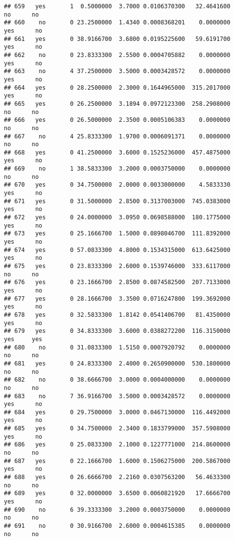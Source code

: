 \documentclass[]{article}
\begin{document}
\begin{verbatim}
## 659   yes       1  0.5000000  3.7000 0.0106370300   32.4641600    no      no
## 660    no       0 23.2500000  1.4340 0.0008368201    0.0000000   yes      no
## 661   yes       0 38.9166700  3.6800 0.0195225600   59.6191700   yes      no
## 662    no       0 23.8333300  2.5500 0.0004705882    0.0000000   yes      no
## 663    no       4 37.2500000  3.5000 0.0003428572    0.0000000   yes      no
## 664   yes       0 28.2500000  2.3000 0.1644965000  315.2017000   yes      no
## 665   yes       0 26.2500000  3.1894 0.0972123300  258.2908000    no      no
## 666   yes       0 26.5000000  2.3500 0.0005106383    0.0000000    no      no
## 667    no       4 25.8333300  1.9700 0.0006091371    0.0000000    no      no
## 668   yes       0 41.2500000  3.6000 0.1525236000  457.4875000   yes      no
## 669    no       1 38.5833300  3.2000 0.0003750000    0.0000000    no      no
## 670   yes       0 34.7500000  2.0000 0.0033000000    4.5833330   yes      no
## 671   yes       0 31.5000000  2.8500 0.3137003000  745.0383000   yes      no
## 672   yes       0 24.0000000  3.0950 0.0698588000  180.1775000   yes      no
## 673   yes       0 25.1666700  1.5000 0.0898046700  111.8392000   yes      no
## 674   yes       0 57.0833300  4.8000 0.1534315000  613.6425000   yes      no
## 675   yes       0 23.8333300  2.6000 0.1539746000  333.6117000    no      no
## 676   yes       0 23.1666700  2.8500 0.0874582500  207.7133000   yes      no
## 677   yes       0 28.1666700  3.3500 0.0716247800  199.3692000   yes      no
## 678   yes       0 32.5833300  1.8142 0.0541406700   81.4350000   yes      no
## 679   yes       0 34.8333300  3.6000 0.0388272200  116.3150000   yes     yes
## 680    no       0 31.0833300  1.5150 0.0007920792    0.0000000    no      no
## 681   yes       0 24.8333300  2.4000 0.2650900000  530.1800000    no      no
## 682    no       0 38.6666700  3.0000 0.0004000000    0.0000000    no      no
## 683    no       7 36.9166700  3.5000 0.0003428572    0.0000000   yes      no
## 684   yes       0 29.7500000  3.0000 0.0467130000  116.4492000   yes      no
## 685   yes       0 34.7500000  2.3400 0.1833799000  357.5908000   yes      no
## 686   yes       0 25.0833300  2.1000 0.1227771000  214.8600000    no      no
## 687   yes       0 22.1666700  1.6000 0.1506275000  200.5867000   yes      no
## 688   yes       0 26.6666700  2.2160 0.0307563200   56.4633300    no      no
## 689   yes       0 32.0000000  3.6500 0.0060821920   17.6666700   yes      no
## 690    no       6 39.3333300  3.2000 0.0003750000    0.0000000    no      no
## 691    no       0 30.9166700  2.6000 0.0004615385    0.0000000    no      no

\end{verbatim}
\end{document}
